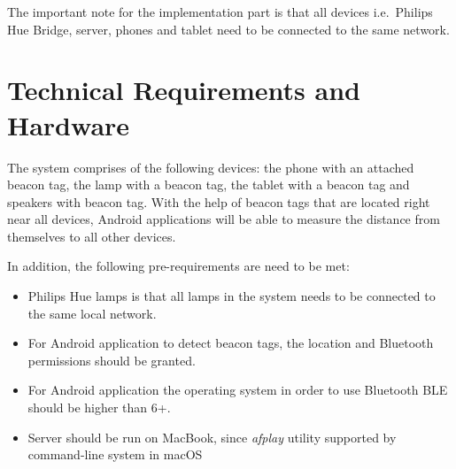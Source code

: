 The important note for the implementation part is that all devices i.e.\ Philips Hue Bridge, server, phones and tablet
need to be connected to the same network.


\section{Technical Requirements and Hardware}
\label{sec:technical-requirements-and-hardware}
The system comprises of the following devices: the phone with an attached beacon tag,
the lamp with a beacon tag, the tablet with a beacon tag and speakers with beacon tag.
With the help of beacon tags that are located right near all devices, Android applications
will be able to measure the distance from themselves to all other devices.

In addition, the following pre-requirements are need to be met:
\begin{itemize}
    \item Philips Hue lamps is that all lamps in the system needs to be connected to the same local network.
    \item For Android application to detect beacon tags, the location and Bluetooth permissions should be granted.
    \item For Android application the operating system in order to use Bluetooth BLE should be higher than 6+.
    \item Server should be run on MacBook, since \emph{afplay} utility supported by command-line system in macOS
\end{itemize}



